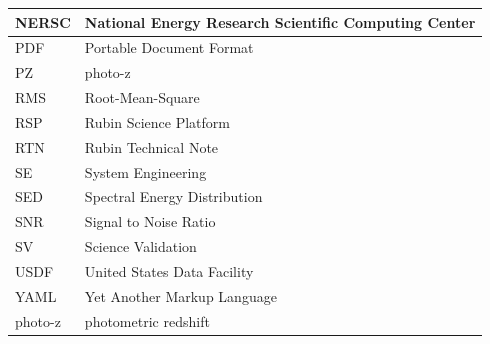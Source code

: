 \begin{longtable}{p{}p{}}
NERSC & National Energy Research Scientific Computing Center \\\hline
PDF & Portable Document Format \\\hline
PZ & photo-z \\\hline
RMS & Root-Mean-Square \\\hline
RSP & Rubin Science Platform \\\hline
RTN & Rubin Technical Note \\\hline
SE & System Engineering \\\hline
SED & Spectral Energy Distribution \\\hline
SNR & Signal to Noise Ratio \\\hline
SV & Science Validation \\\hline
USDF & United States Data Facility \\\hline
YAML & Yet Another Markup Language \\\hline
photo-z & photometric redshift \\\hline
\end{longtable}
